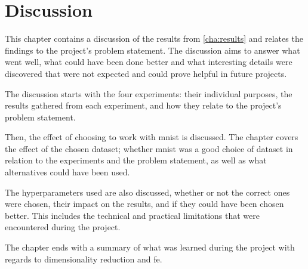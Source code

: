 \chapter{Discussion}\label{cha:discussion}
This chapter contains a discussion of the results from \autoref{cha:results} and relates the findings to the project's problem statement. The discussion aims to answer what went well, what could have been done better and what interesting details were discovered that were not expected and could prove helpful in future projects.

The discussion starts with the four experiments: their individual purposes, the results gathered from each experiment, and how they relate to the project's problem statement.

Then, the effect of choosing to work with \gls{mnist} is discussed. The chapter covers the effect of the chosen dataset; whether \gls{mnist} was a good choice of dataset in relation to the experiments and the problem statement, as well as what alternatives could have been used.

The hyperparameters used are also discussed, whether or not the correct ones were chosen, their impact on the results, and if they could have been chosen better. This includes the technical and practical limitations that were encountered during the project.

The chapter ends with a summary of what was learned during the project with regards to dimensionality reduction and \gls{fe}.




% 
% 
% 